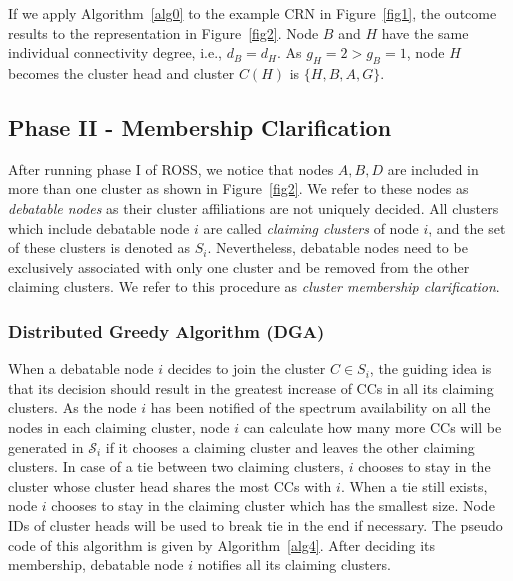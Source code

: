 \documentclass[times]{ettauth}
\theoremstyle{mytheoremstyle}
\theoremstyle{mytheoremstyle}
\theoremstyle{mytheoremstyle}
\begin{document}
If we apply Algorithm~\ref{alg0} to the example CRN in Figure~\ref{fig1}, the outcome results to the representation in Figure~\ref{fig2}.
Node $B$ and $H$ have the same individual connectivity degree, i.e., $d_B=d_H$. As $g_H=2>g_B=1$, node $H$ becomes the cluster head and cluster $C(H)$ is $\{H, B, A, G\}$.


\subsection{Phase II - Membership Clarification}
\label{membershipClarification}
After running phase I of ROSS, we notice that nodes $A, B, D$ are included in more than one cluster as shown in Figure~\ref{fig2}. 
We refer to these nodes as \textit{debatable nodes} as their cluster affiliations are not uniquely decided.
All clusters which include debatable node $i$ are called \textit{claiming clusters} of node $i$, and the set of these clusters is denoted as $S_i$.  
Nevertheless, debatable nodes need to be exclusively associated with only one cluster and be removed from the other claiming clusters.
We refer to this procedure as \textit{cluster membership clarification}.

\subsubsection{Distributed Greedy Algorithm (DGA)}
When a debatable node $i$ decides to join the cluster $C\in S_i$, the guiding idea is that its decision should result in the greatest increase of CCs in all its claiming clusters.
As the node $i$ has been notified of the spectrum availability on all the nodes in each claiming cluster, node $i$ can calculate how many more CCs will be generated in $\mathcal{S}_i$ if it chooses a claiming cluster and leaves the other claiming clusters.
In case of a tie between two claiming clusters, $i$ chooses to stay in the cluster whose cluster head shares the most CCs with $i$.
When a tie still exists, node $i$ chooses to stay in the claiming cluster which has the smallest size.
Node IDs of cluster heads will be used to break tie in the end if necessary.
The pseudo code of this algorithm is given by Algorithm~\ref{alg4}.
After deciding its membership, debatable node $i$ notifies all its claiming clusters.
\end{document}
